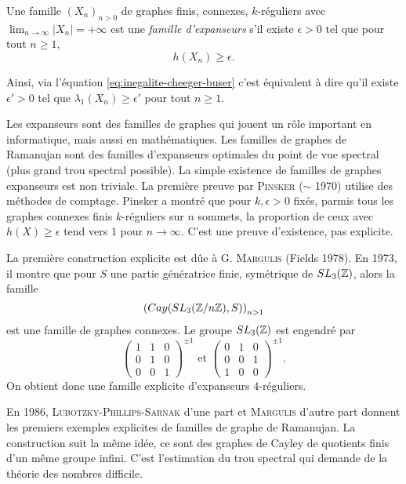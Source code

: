 \begin{defi}
  Une famille $(X_n)_{n>0}$ de graphes finis, connexes, $k$-réguliers avec $\lim_{n \to \infty} |X_n|=+\infty$
  est une \emph{famille d'expanseurs} s'il existe $\epsilon > 0$ tel que pour tout $n \geq 1$,
  \[ h(X_n) \geq \epsilon. \]
\end{defi}

Ainsi, via l'équation \eqref{eq:inegalite-cheeger-buser} c'est équivalent à dire qu'il existe $\epsilon' > 0$
tel que $\lambda_1(X_n) \geq \epsilon'$ pour tout $n \geq 1$.

Les expanseurs sont des familles de graphes qui jouent un rôle important en informatique, mais aussi en
mathématiques. Les familles de graphes de Ramanujan sont des familles d'expanseurs optimales du point de vue
spectral (plus grand trou spectral possible). La simple existence de familles de graphes expanseurs est non
triviale. La première preuve par \textsc{Pinsker} ($\sim$ 1970) utilise des méthodes de comptage. Pinsker a
montré que pour $k, \epsilon > 0$ fixés, parmis tous les graphes connexes finis $k$-réguliers sur $n$
sommets, la proportion de ceux avec $h(X) \geq \epsilon$ tend vers $1$ pour $n \to \infty$. C'est une preuve
d'existence, pas explicite.

La première construction explicite est dûe à G. \textsc{Margulis} (Fields 1978). En 1973, il montre que pour
$S$ une partie génératrice finie, symétrique de $SL_3(\mathbb{Z})$, alors la famille 
\[ \left( Cay(SL_3(\mathbb{Z} / n \mathbb{Z}), S) \right)_{n > 1} \]
est une famille de graphes connexes. Le groupe $SL_3(\mathbb{Z})$ est engendré par 
\[
  \begin{pmatrix}
    1 & 1 & 0\\
    0 & 1 & 0\\
    0 & 0 & 1
  \end{pmatrix}^{\pm 1}
  \text{ et }
  \begin{pmatrix}
    0 & 1 & 0\\
    0 & 0 & 1\\
    1 & 0 & 0
  \end{pmatrix}^{\pm 1}.
\]
On obtient donc une famille explicite d'expanseurs $4$-réguliers.

En 1986, \textsc{Lubotzky-Phillips-Sarnak} d'une part et \textsc{Margulis} d'autre part donnent les premiers
exemples explicites de familles de graphe de Ramanujan. La construction suit la même idée, ce sont des graphes
de Cayley de quotients finis d'un même groupe infini. C'est l'estimation du trou spectral qui demande de la
théorie des nombres difficile.


















